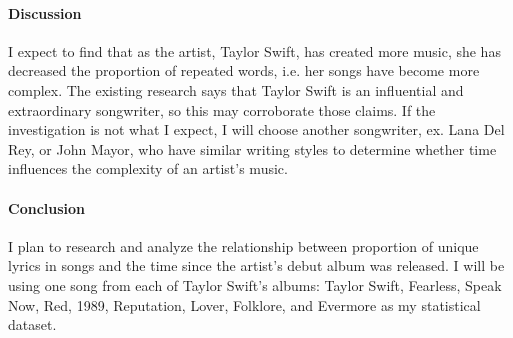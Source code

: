 \documentclass[12pt]{article}
\begin{document}
\paragraph{Discussion}
I expect to find that as the artist, Taylor Swift, has created more music, she has decreased the proportion of repeated words, i.e. her songs have become more complex. The existing research says that Taylor Swift is an influential and extraordinary songwriter, so this may corroborate those claims. If the investigation is not what I expect, I will choose another songwriter, ex. Lana Del Rey, or John Mayor, who have similar writing styles to determine whether time influences the complexity of an artist’s music. 

\paragraph{Conclusion}
I plan to research and analyze the relationship between proportion of unique lyrics in songs and the time since the artist's debut album was released. I will be using one song from each of Taylor Swift's albums: Taylor Swift, Fearless, Speak Now, Red, 1989, Reputation, Lover, Folklore, and Evermore as my statistical dataset. 



\end{document}
